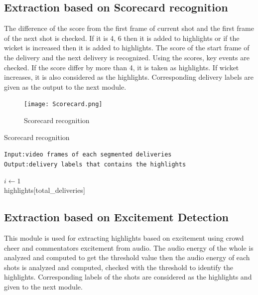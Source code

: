 \subsection{Extraction based on Scorecard recognition}

The difference of the score from the first frame of current shot and the first frame of the next shot is checked. If it is 4, 6 then it is added to highlights or if the wicket is increased then it is added to highlights. The score of the start frame of the delivery and the next delivery is recognized. Using the scores, key events are checked. If the score differ by more than 4, it is taken as highlights. If wicket increases, it is also considered as the highlights. Corresponding delivery labels are given as the output to the next module.

\begin{figure}[h]
    \centering
    \texttt{[image: Scorecard.png]}
    \caption{Scorecard recognition}
    \label{fig:Scorecard}
\end{figure}
\begin{algorithm}
\caption{Scorecard recognition}
\State \texttt{Input:video frames of each segmented deliveries}\\
\State \texttt{Output:delivery labels that contains the highlights}\\
\EndFunction
\begin{algorithmic}
\ELSE {}
\ENDIF
\EndFunction

\state $i \leftarrow 1$\\
\state highlights[total\_deliveries]\\
\ENDIF
\ENDWHILE
\end{algorithmic}
\end{algorithm}
\newpage
\subsection{Extraction based on Excitement Detection}

This module is used for extracting highlights based on excitement using crowd cheer and commentators excitement from audio. The audio energy of the whole is analyzed and computed to get the threshold value then the audio energy of each shots is analyzed and computed, checked with the threshold to identify the highlights. Corresponding labels of the shots are considered as the highlights and given to the next module.

